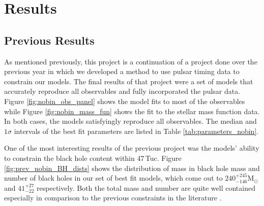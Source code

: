 


\section{Results}



\subsection{Previous Results}

As mentioned previously, this project is a continuation of a project done over the previous year in
which we developed a method to use pulsar timing data to constrain our models. The final results of
that project were a set of models that accurately reproduce all observables and fully incorporated
the pulsar data. Figure \ref{fig:nobin_obs_panel} shows the model fits to most of the observables
while Figure \ref{fig:nobin_mass_fun} shows the fit to the stellar mass function data. In both
cases, the models satisfyingly reproduce all observables. The median and $1\sigma$ intervals of the
best fit parameters are listed in Table \ref{tab:parameters_nobin}.

One of the most interesting results of the previous project was the models' ability to constrain the
black hole content within 47\,Tuc. Figure \ref{fig:prev_nobin_BH_dists} shows the distribution of
mass in black hole mass and number of black holes in our set of best fit models, which come out to
$240^{+245}_{-146} \mathrm{M}_\odot$ and $41^{+27}_{-22}$ respectively. Both the total mass and
number are quite well contained especially in comparison to the previous constraints in the
literature \citep[see e.g.][]{Henault-Brunet2020,Weatherford2019}.





